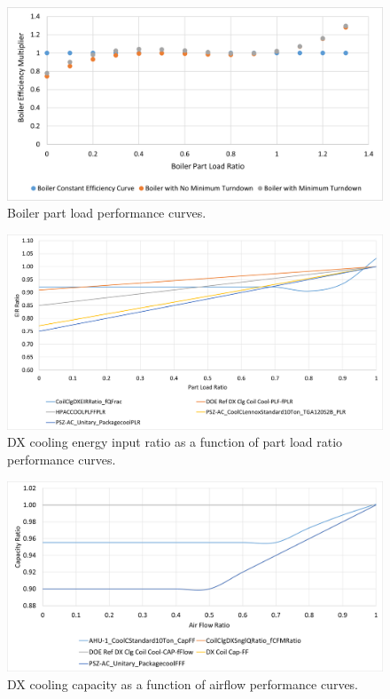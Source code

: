 \pagebreak

\begin{figure}
    \centering \includegraphics[width=1.0\textwidth]{figures/boiler_performance_curves.png}
    \caption[Boiler part load performance curves]{Boiler part load performance curves.}
    \label{fig:blr_plr_curves}
\end{figure}


\begin{figure}
    \centering \includegraphics[width=1.0\textwidth]{figures/EIRFPLR.png}
    \caption[DX cooling energy input ratio as a function of part load ratio performance curves]{DX cooling energy input ratio as a function of part load ratio performance curves.}
    \label{fig:dx_eirfplr}
\end{figure}

\begin{figure}
    \centering \includegraphics[width=1.0\textwidth]{figures/CAPFF.png}
    \caption[DX cooling capacity as a function of airflow performance curves]{DX cooling capacity as a function of airflow performance curves.}
    \label{fig:dx_capff}
\end{figure}

